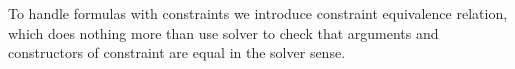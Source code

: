 \documentclass[english, mgr]{iithesis}
\begin{document}
To handle formulas with constraints we introduce constraint equivalence relation,
which does nothing more than use solver to check that arguments and constructors
of constraint are equal in the solver sense.


\end{document}
